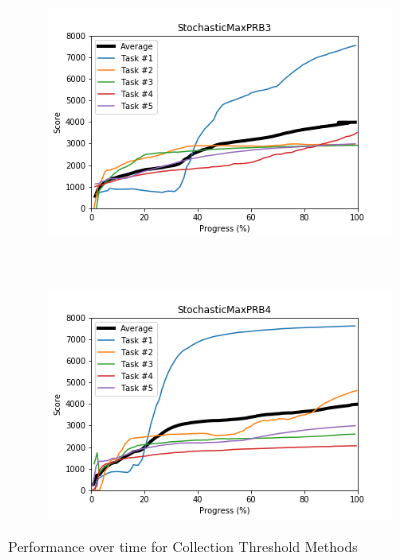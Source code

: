 \documentclass{article} %
\begin{document}
\begin{figure}[!ht]
    \begin{subfigure}[t]{0.5\textwidth}
        \centering
        \includegraphics[width=\textwidth]{images/StochasticMaxPRB3.png}
    \end{subfigure}%
     ~
    \begin{subfigure}[t]{0.5\textwidth}
        \centering
        \includegraphics[width=\textwidth]{images/StochasticMaxPRB4.png}
    \end{subfigure}%
    \caption{Performance over time for Collection Threshold Methods}
        \label{fig:collection_performance}
\end{figure}

\clearpage
\end{document}
